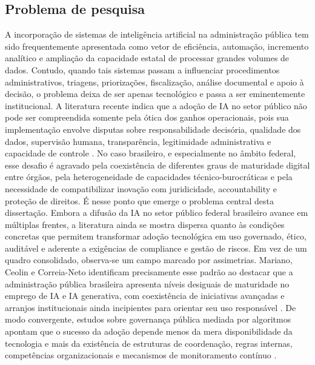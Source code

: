 \documentclass[12pt,a4paper]{article}
\begin{document}
\subsection{Problema de pesquisa}
\label{sec:org1287e85}
A incorporação de sistemas de inteligência artificial na administração pública tem sido frequentemente apresentada como vetor de eficiência, automação, incremento analítico e ampliação da capacidade estatal de processar grandes volumes de dados. Contudo, quando tais sistemas passam a influenciar procedimentos administrativos, triagens, priorizações, fiscalização, análise documental e apoio à decisão, o problema deixa de ser apenas tecnológico e passa a ser eminentemente institucional. A literatura recente indica que a adoção de IA no setor público não pode ser compreendida somente pela ótica dos ganhos operacionais, pois sua implementação envolve disputas sobre responsabilidade decisória, qualidade dos dados, supervisão humana, transparência, legitimidade administrativa e capacidade de controle \autocite{madan2022ai} \autocite{parycek2023artificial} \autocite{criado2024artificial}. No caso brasileiro, e especialmente no âmbito federal, esse desafio é agravado pela coexistência de diferentes graus de maturidade digital entre órgãos, pela heterogeneidade de capacidades técnico-burocráticas e pela necessidade de compatibilizar inovação com juridicidade, accountability e proteção de direitos.
É nesse ponto que emerge o problema central desta dissertação. Embora a difusão da IA no setor público federal brasileiro avance em múltiplas frentes, a literatura ainda se mostra dispersa quanto às condições concretas que permitem transformar adoção tecnológica em uso governado, ético, auditável e aderente a exigências de compliance e gestão de riscos. Em vez de um quadro consolidado, observa-se um campo marcado por assimetrias. Mariano, Ceolin e Correia-Neto identificam precisamente esse padrão ao destacar que a administração pública brasileira apresenta níveis desiguais de maturidade no emprego de IA e IA generativa, com coexistência de iniciativas avançadas e arranjos institucionais ainda incipientes para orientar seu uso responsável \autocite{mariano2026inteligencia}. De modo convergente, estudos sobre governança pública mediada por algoritmos apontam que o sucesso da adoção depende menos da mera disponibilidade da tecnologia e mais da existência de estruturas de coordenação, regras internas, competências organizacionais e mecanismos de monitoramento contínuo \autocite{goulart2025processos} \autocite{batool2025ai}.
\end{document}
